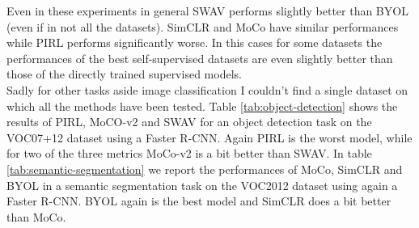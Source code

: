 \begin{table}[H]
	\centering
	\caption{Result after fine-tuning on 1\% of the data of ImageNet}
	\label{tab:classification-multi-dataset-finetune}
\end{table}
\noindent Even in these experiments in general SWAV performs slightly better than BYOL (even if in not all the datasets). SimCLR and MoCo have similar performances while PIRL performs significantly worse. In this cases for some datasets the performances of the best self-supervised datasets are even slightly better than those of the directly trained supervised models.\\
Sadly for other tasks aside image classification I couldn't find a single dataset on which all the methods have been tested. Table \ref{tab:object-detection} shows the results of PIRL, MoCO-v2 and SWAV for an object detection task on the VOC07+12 dataset using a Faster R-CNN. Again PIRL is the worst model, while for two of the three metrics MoCo-v2 is a bit better than SWAV. In table \ref{tab:semantic-segmentation} we report the performances of MoCo, SimCLR and BYOL in a semantic segmentation task on the VOC2012 dataset using again a Faster R-CNN. BYOL again is the best model and SimCLR does a bit better than MoCo.
